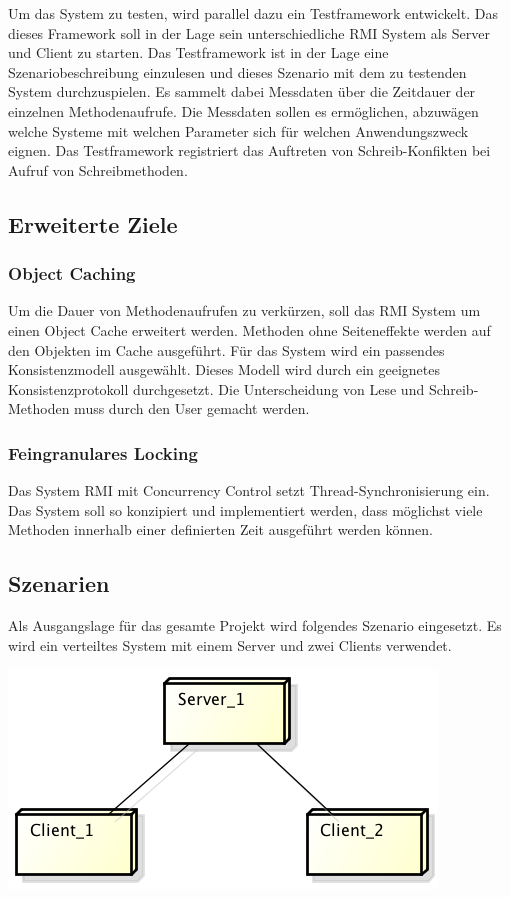 \documentclass{article}
\begin{document}
Um das System zu testen, wird parallel dazu ein Testframework entwickelt. Das dieses Framework soll in der Lage sein unterschiedliche RMI System als Server und Client zu starten. Das Testframework ist in der Lage eine Szenariobeschreibung einzulesen und dieses Szenario mit dem zu testenden System durchzuspielen. Es sammelt dabei Messdaten über die Zeitdauer der einzelnen Methodenaufrufe. Die Messdaten sollen es ermöglichen, abzuwägen welche Systeme mit welchen Parameter sich für welchen Anwendungszweck eignen.
Das Testframework registriert das Auftreten von Schreib-Konfikten bei Aufruf von Schreibmethoden.

\subsection{Erweiterte Ziele}
\label{sec:erweiterte-ziele}

\subsubsection{Object Caching}
\label{sec:object-caching}

Um die Dauer von Methodenaufrufen zu verkürzen, soll das RMI System um einen Object Cache erweitert werden. Methoden ohne Seiteneffekte werden auf den Objekten im Cache ausgeführt. Für das System wird ein passendes Konsistenzmodell ausgewählt. Dieses Modell wird durch ein geeignetes Konsistenzprotokoll durchgesetzt. Die Unterscheidung von Lese und Schreib- Methoden muss durch den User gemacht werden.

\subsubsection{Feingranulares Locking}
\label{sec:feingr-lock}

Das System RMI mit Concurrency Control setzt Thread-Synchronisierung ein. Das System soll so konzipiert und implementiert werden, dass möglichst viele Methoden innerhalb einer definierten Zeit ausgeführt werden können.

\subsection{Szenarien}
\label{sec:szenario}

Als Ausgangslage für das gesamte Projekt wird folgendes Szenario eingesetzt. Es wird ein verteiltes System mit einem Server und zwei Clients verwendet.\\
\begin{center}
\includegraphics[scale=0.85]{Deployment.png}
\end{center}
\end{document}
